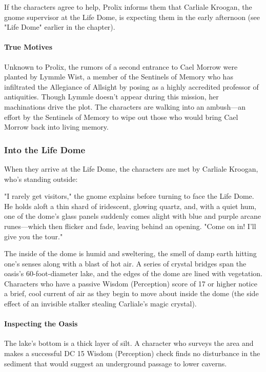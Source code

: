 \documentclass[10pt,a4paper,twoside,bg=print,twocolumn,openany,nodeprecatedcode]{dndbook}
\begin{document}
If the characters agree to help, Prolix informs them that Carliale Kroogan, the gnome supervisor at the Life Dome, is expecting them in the early afternoon (see "Life Dome" earlier in the chapter).

\paragraph{True Motives}
Unknown to Prolix, the rumors of a second entrance to Cael Morrow were planted by Lymmle Wist, a member of the Sentinels of Memory who has infiltrated the Allegiance of Allsight by posing as a highly accredited professor of antiquities. Though Lymmle doesn't appear during this mission, her machinations drive the plot. The characters are walking into an ambush—an effort by the Sentinels of Memory to wipe out those who would bring Cael Morrow back into living memory.

\subsubsection{Into the Life Dome}
When they arrive at the Life Dome, the characters are met by Carliale Kroogan, who's standing outside:

\begin{DndReadAloud}{}
"I rarely get visitors," the gnome explains before turning to face the Life Dome. He holds aloft a thin shard of iridescent, glowing quartz, and, with a quiet hum, one of the dome's glass panels suddenly comes alight with blue and purple arcane runes—which then flicker and fade, leaving behind an opening. "Come on in! I'll give you the tour."

\end{DndReadAloud}

The inside of the dome is humid and sweltering, the smell of damp earth hitting one's senses along with a blast of hot air. A series of crystal bridges span the oasis's 60-foot-diameter lake, and the edges of the dome are lined with vegetation. Characters who have a passive Wisdom (Perception) score of 17 or higher notice a brief, cool current of air as they begin to move about inside the dome (the side effect of an invisible stalker stealing Carliale's magic crystal).

\paragraph{Inspecting the Oasis}
The lake's bottom is a thick layer of silt. A character who surveys the area and makes a successful DC 15 Wisdom (Perception) check finds no disturbance in the sediment that would suggest an underground passage to lower caverns.
\end{document}
